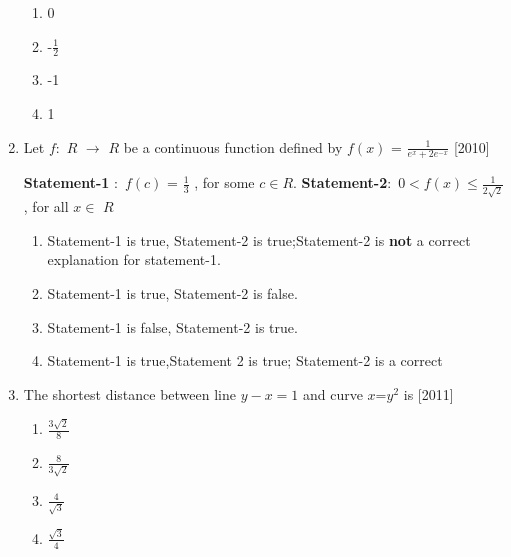 \documentclass[journal,12pt,onecolumn]{IEEEtran}
\theoremstyle{remark}
\begin{document}
\begin{enumerate}
\begin{multicols}{4}
        
        \begin{enumerate}
        
            
        
        \item 0
        \item -$\frac{1}{2}$
        \item -1
        \item 1
        
        \end{enumerate}
        \end{multicols}
            
     \item Let $f$$\colon$ $R$ $\to$ $R$ be a continuous function defined by $f(x)$ = $\frac{1}{e^x + 2e^{-x}}$ \hfill[2010]
      
        \begin{enumerate}
    
            
        
            
            \textbf{Statement-1} $\colon$ $f(c)$ = $\frac{1}{3}$ , for some $c$$\in$$R$.
            \textbf{Statement-2}$\colon$ 0$<$$f(x)$$\leq$$\frac{1}{2\sqrt{2}}$, for all $x$$\in$ $R$
            
       
        \end{enumerate}
         
            \begin{enumerate}
            
                
            
                \item Statement-1 is true, Statement-2 is true;Statement-2 is \textbf{not} a correct explanation for statement-1.
        \item Statement-1 is true, Statement-2 is false.
        \item Statement-1 is false, Statement-2 is true.
        \item Statement-1 is true,Statement 2 is true; Statement-2 is a correct 
    
        
            \end{enumerate}
           
            
            \item The shortest distance between line $y-x=1$ and curve $x$=$y^2$ is \hfill[2011]
             \begin{multicols}{4}
            \begin{enumerate}
            
                
    \item $\frac{3\sqrt{2}}{8}$
        \item $\frac{8}{3\sqrt{2}}$
        \item $\frac{4}{\sqrt{3}}$
        \item $\frac{\sqrt{3}}{4}$
        
            \end{enumerate}
            \end{multicols}
            
    
        
        
    
    \end{enumerate}
\end{document}
